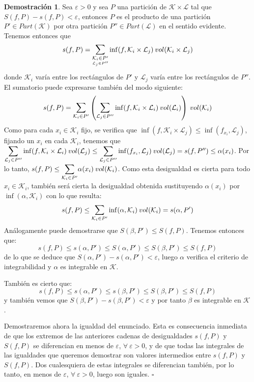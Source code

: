 \documentclass[12pt,twoside]{report}
\newcommand\mc[1]{\mathcal{#1}}
\theoremstyle{azul}
\theoremstyle{azul2}
\theoremstyle{plain}
\theoremstyle{definition}
\newtheorem*{dem}{Demostración}
\theoremstyle{remark}
\begin{document}
\begin{dem} \:

Sea $\varepsilon > 0$ y sea $P$ una partición de $\mc{K} \times \mc{L}$ tal que $S(f,P) - s(f,P) < \varepsilon$, entonces $P$ es el producto de una partición $P'\in Part(\mc{K})$ por otra partición $P''\in Part(\mc{L})$ en el sentido evidente. Tenemos entonces que 
$$s(f,P)=\underset{{\underset{\mc{L}_j \in P''}{\mc{K}_i \in P' }}}{\mathlarger{\sum}} \inf(f,\mc{K}_i \times \mc{L}_j) \: vol(\mc{K}_i \times \mc{L}_j)$$
donde $\mc{K}_i$ varía entre los rectángulos de $P'$ y $\mc{L}_j$ varía entre los rectángulos de $P''$. El sumatorio puede expresarse también del modo siguiente:
$$s(f,P)=\underset{\mc{K}_i \in P'}{\mathlarger{\sum}}\left(\underset{\mc{L}_j \in P''}{\mathlarger{\sum}} \inf(f,\mc{K}_i \times \mc{L}_i) \: vol(\mc{L}_i)\right) \: vol(\mc{K}_i)$$
Como para cada $x_i \in \mc{K}_i$ fijo, se verifica que $\inf(f,\mc{K}_i \times \mc{L}_j) \leq \inf(f_{x_i}, \mc{L}_j)$, fijando un $x_i$ en cada $\mc{K}_i$, tenemos que $\underset{\mc{L}_j \in P''}{\mathlarger{\sum}} \inf(f,\mc{K}_i \times \mc{L}_i) \: vol(\mc{L}_j) \leq \underset{\mc{L}_j \in P''}{\mathlarger{\sum}} \inf(f_{x_i},\mc{L}_j) \: vol(\mc{L}_j)=s(f,P'')\leq \alpha(x_i)$. Por lo tanto, $s(f,P) \leq \underset{\mc{K}_i \in P'}{\mathlarger{\sum}} \alpha(x_i) \: vol(\mc{K}_i)$. Como esta desigualdad es cierta para todo $x_i \in \mc{K}_i$, también será cierta la desigualdad obtenida sustituyendo $\alpha(x_i)$ por $\inf(\alpha, \mc{K}_i)$ con lo que resulta:
$$s(f,P) \leq \underset{\mc{K}_i \in P'}{\mathlarger{\sum}} \inf(\alpha,\mc{K}_i) \: vol(\mc{K}_i) = s(\alpha, P')$$
Análogamente puede demostrarse que $S(\beta, P') \leq S(f,P)$. Tenemos entonces que:
$$s(f,P)\leq s(\alpha,P') \leq S(\alpha, P') \leq S(\beta,P') \leq S(f,P)$$
de lo que se deduce que $S(\alpha,P')-s(\alpha,P') < \varepsilon$, luego $\alpha$ verifica el criterio de integrabilidad y $\alpha$ es integrable en $\mc{K}$.

También es cierto que:
$$s(f,P)\leq s(\alpha,P') \leq s(\beta, P') \leq S(\beta,P') \leq S(f,P)$$ 
y también vemos que $S(\beta, P') - s(\beta, P') < \varepsilon$ y por tanto $\beta$ es integrable en $\mc{K}$.

Demostraremos ahora la igualdad del enunciado. Esta es consecuencia inmediata de que los extremos de las anteriores cadenas de desigualdades $s(f,P)$ y $S(f,P)$ se diferencian en menos de $\varepsilon$, $\forall \: \varepsilon > 0$, y de que todas las integrales de las igualdades que queremos demostrar son valores intermedios entre $s(f,P)$ y $S(f,P)$. Dos cualesquiera de estas integrales se diferencian también, por lo tanto, en menos de $\varepsilon$, $\forall \: \varepsilon > 0$, luego son iguales. $\square$
\end{dem}
\end{document}

